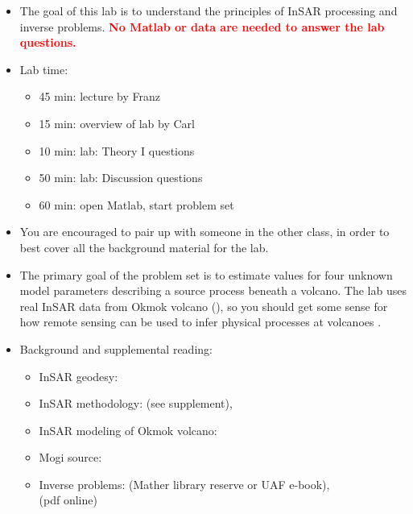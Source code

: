 \documentclass[11pt,titlepage,fleqn]{article}
\begin{document}
\begin{itemize}
\item The goal of this lab is to understand the principles of InSAR processing and inverse problems. 
\textcolor{red}{\bf No Matlab or data are needed to answer the lab questions.}

\item Lab time:
%
\begin{itemize}
\item 45 min: lecture by Franz
\item 15 min: overview of lab by Carl
\item 10 min: lab: Theory I questions
\item 50 min: lab: Discussion questions
\item 60 min: open Matlab, start problem set
\end{itemize}

\item You are encouraged to pair up with someone in the other class, in order to best cover all the background material for the lab.

\item The primary goal of the problem set is to estimate values for four unknown model parameters describing a source process beneath a volcano. The lab uses real InSAR data from Okmok volcano (), so you should get some sense for how remote sensing can be used to infer physical processes at volcanoes \citep[\eg][]{ZLu2005}.

\item Background and supplemental reading:
%
\begin{itemize}
\item InSAR geodesy: \citet{Rosen2000,SimonsRosen2007}

\item InSAR methodology: \citet{Wright2003} (see supplement), \citet{ZLu2007}

\item InSAR modeling of Okmok volcano: \citet{ZLu2005}

\item Mogi source: \citet{Mogi1958}

\item Inverse problems: \citet{AsterE2} (Mather library reserve or UAF e-book), \\
\citet{Tarantola2005} (pdf online)

\end{itemize}

\end{itemize}
\end{document}
